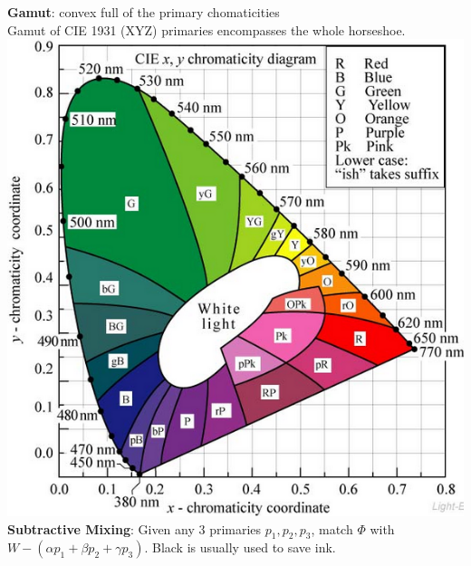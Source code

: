 \documentclass[3pt,landscape]{article}
\begin{document}
\begin{multicols}{3}
{\bf Gamut}: convex full of the primary chomaticities\\
Gamut of CIE 1931 (XYZ) primaries encompasses the whole horseshoe.\\
\includegraphics[scale=0.4]{images/gamut}\\
{\bf Subtractive Mixing}: Given any 3 primaries \(p_1,p_2,p_3\), match \(\Phi\) with \(W-(\alpha p_1 + \beta p_2 + \gamma p_3)\). Black is usually used to save ink.\\


\end{multicols}
\end{document}
